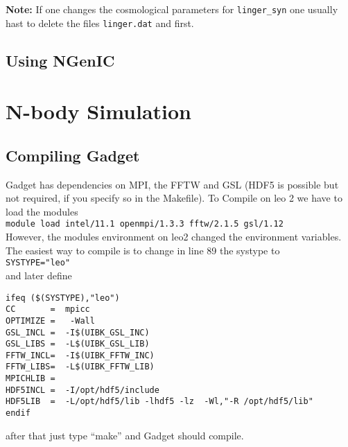 \documentclass[a4paper,english,10.5pt]{scrartcl}
\begin{document}
\begin{description}
\textbf{Note: } If one changes the cosmological parameters for 
\texttt{linger\_syn} one usually hast to delete the files \texttt{linger.dat} 
and  first. 

\end{description}



\subsection{Using NGenIC}

\section{N-body Simulation}

\subsection{Compiling Gadget}
Gadget has dependencies on MPI, the FFTW and GSL (HDF5 is possible but not required, if you specify so in the Makefile). To Compile on leo 2 we have to load the modules\\
\texttt{module load intel/11.1 openmpi/1.3.3 fftw/2.1.5   gsl/1.12}\\
However, the modules environment on leo2 changed the environment variables. The easiest way to compile is to change in line 89 the systype to\\
\texttt{SYSTYPE="leo"}\\
and later define
\begin{verbatim}
ifeq ($(SYSTYPE),"leo")
CC       =  mpicc   
OPTIMIZE =   -Wall 
GSL_INCL =  -I$(UIBK_GSL_INC)
GSL_LIBS =  -L$(UIBK_GSL_LIB) 
FFTW_INCL=  -I$(UIBK_FFTW_INC)
FFTW_LIBS=  -L$(UIBK_FFTW_LIB)
MPICHLIB =
HDF5INCL =  -I/opt/hdf5/include
HDF5LIB  =  -L/opt/hdf5/lib -lhdf5 -lz  -Wl,"-R /opt/hdf5/lib"
endif
\end{verbatim}
after that just type ``make'' and Gadget should compile.
\end{document}
